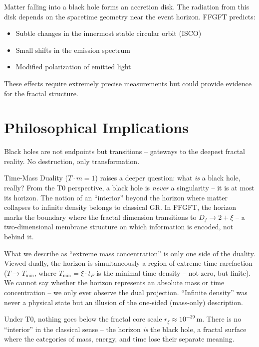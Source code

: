 Matter falling into a black hole forms an accretion disk. The radiation from this disk depends on the spacetime geometry near the event horizon. FFGFT predicts:

\begin{itemize}[leftmargin=*]
\item Subtle changes in the innermost stable circular orbit (ISCO)
\item Small shifts in the emission spectrum
\item Modified polarization of emitted light
\end{itemize}

These effects require extremely precise measurements but could provide evidence for the fractal structure.

\section{Philosophical Implications}

Black holes are not endpoints but transitions -- gateways to the deepest fractal reality. No destruction, only transformation.

Time-Mass Duality ($T \cdot m = 1$) raises a deeper question: what \textit{is} a black hole, really? From the T0 perspective, a black hole is \textit{never} a singularity -- it is at most its horizon. The notion of an ``interior'' beyond the horizon where matter collapses to infinite density belongs to classical GR. In FFGFT, the horizon marks the boundary where the fractal dimension transitions to $D_f \to 2 + \xi$ -- a two-dimensional membrane structure on which information is encoded, not behind it.

What we describe as ``extreme mass concentration'' is only one side of the duality. Viewed dually, the horizon is simultaneously a region of extreme time rarefaction ($T \to T_{\min}$, where $T_{\min} = \xi \cdot t_P$ is the minimal time density -- not zero, but finite). We cannot say whether the horizon represents an absolute mass or time concentration -- we only ever observe the dual projection. ``Infinite density'' was never a physical state but an illusion of the one-sided (mass-only) description.

Under T0, nothing goes below the fractal core scale $r_\xi \approx 10^{-39}\,$m. There is no ``interior'' in the classical sense -- the horizon \textit{is} the black hole, a fractal surface where the categories of mass, energy, and time lose their separate meaning.

